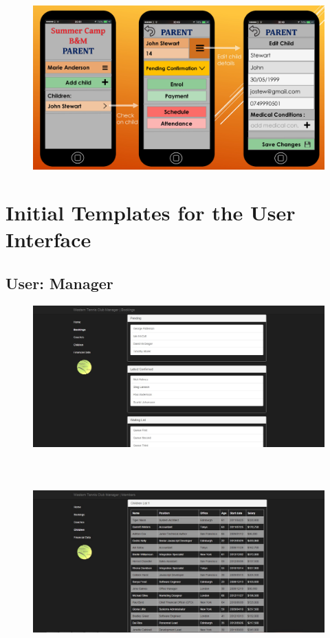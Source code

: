 \documentclass{l3proj}
\begin{document}
{\begin{figure}[h]
\includegraphics[scale=0.20]{page-24.jpg}
\end{figure}
}

\pagebreak
\section{Initial Templates for the User Interface}

\subsection{User: Manager}

{
\begin{figure}[h]
\includegraphics[scale=0.50]{managertemplate1.jpg}
\\
\\
\\
\\
\includegraphics[scale=0.50]{managertemplate2.jpg}
\end{figure}
}
\pagebreak
\end{document}
